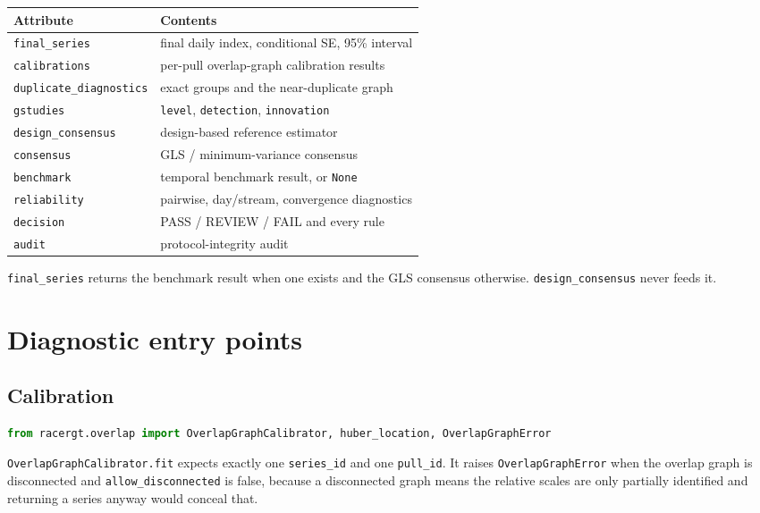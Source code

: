 \documentclass[12pt,a4paper,oneside]{article}
\begin{document}
\begin{table}[H]
\centering\small
\begin{tabularx}{\textwidth}{lX}
\toprule
Attribute & Contents\\
\midrule
\texttt{final\_series} & final daily index, conditional SE, 95\% interval\\
\texttt{calibrations} & per-pull overlap-graph calibration results\\
\texttt{duplicate\_diagnostics} & exact groups and the near-duplicate graph\\
\texttt{gstudies} & \texttt{level}, \texttt{detection}, \texttt{innovation}\\
\texttt{design\_consensus} & design-based reference estimator\\
\texttt{consensus} & GLS / minimum-variance consensus\\
\texttt{benchmark} & temporal benchmark result, or \texttt{None}\\
\texttt{reliability} & pairwise, day/stream, convergence diagnostics\\
\texttt{decision} & PASS / REVIEW / FAIL and every rule\\
\texttt{audit} & protocol-integrity audit\\
\bottomrule
\end{tabularx}
\end{table}

\texttt{final\_series} returns the benchmark result when one exists and the GLS
consensus otherwise. \texttt{design\_consensus} never feeds it.

\section{Diagnostic entry points}

\subsection{Calibration}

\begin{lstlisting}[language=Python]
from racergt.overlap import OverlapGraphCalibrator, huber_location, OverlapGraphError
\end{lstlisting}

\texttt{OverlapGraphCalibrator.fit} expects exactly one \texttt{series\_id} and
one \texttt{pull\_id}. It raises \texttt{OverlapGraphError} when the overlap
graph is disconnected and \texttt{allow\_disconnected} is false, because a
disconnected graph means the relative scales are only partially identified and
returning a series anyway would conceal that.
\end{document}
